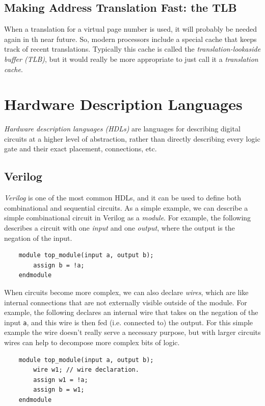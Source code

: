 \documentclass[10pt,a4paper]{article}
\begin{document}
\subsection{Making Address Translation Fast: the TLB}

When a translation for a virtual page number is used, it will probably be needed again in th near future. So, modern processors include a special cache that keeps track of recent translations. Typically this cache is called the \textit{translation-lookaside buffer (TLB)}, but it would really be more appropriate to just call it a \textit{translation cache}.
 
\section{Hardware Description Languages}


\textit{Hardware description languages (HDLs)} are languages for describing digital circuits at a higher level of abstraction, rather than directly describing every logic gate and their exact placement, connections, etc. 

\subsection*{Verilog}

\textit{Verilog} is one of the most common HDLs, and it can be used to define both combinational and sequential circuits. As a simple example, we can describe a simple combinational circuit in Verilog as a \textit{module}. For example, the following describes a circuit with one \textit{input} and one \textit{output}, where the output is the negation of the input.
\begin{verbatim}
    module top_module(input a, output b);
        assign b = !a;
    endmodule
\end{verbatim}
When circuits become more complex, we can also declare \textit{wires}, which are like internal connections that are not externally visible outside of the module. For example, the following declares an internal wire that takes on the negation of the input \verb|a|, and this wire is then fed (i.e. connected to) the output. For this simple example the wire doesn't really serve a necessary purpose, but with larger circuits wires can help to decompose more complex bits of logic.
\begin{verbatim}
    module top_module(input a, output b);
        wire w1; // wire declaration.
        assign w1 = !a;
        assign b = w1;
    endmodule
\end{verbatim}



\end{document}
